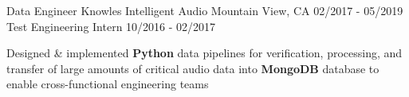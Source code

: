 \begin{cventries}
\cventryupdate
    {Data Engineer} %
    {Knowles Intelligent Audio} %
    {Mountain View, CA} %
    {02/2017 - 05/2019} %
    {Test Engineering Intern} %
    {10/2016 - 02/2017} %
    {
      \begin{cvitems} %
 		\item {Designed \& implemented \textbf{Python} data pipelines for verification, processing, and transfer of large amounts of critical audio data into \textbf{MongoDB} database to enable cross-functional engineering teams}
      \end{cvitems}
    }

\end{cventries}
